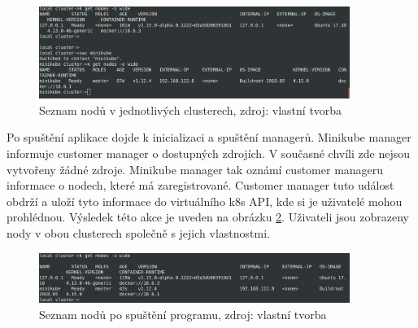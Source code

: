 \begin{figure}[H]
  \begin{centering}
    
	  \includegraphics[width=0.9\textwidth]{images/nodes-init.png}
    \par
	  \caption{Seznam nodů v jednotlivých clusterech\label{fig:nodes-init}, zdroj: vlastní tvorba}
    \end{centering}
\end{figure}

    Po spuštění aplikace dojde k inicializaci a spuštění managerů. Minikube manager informuje customer manager o dostupných zdrojích. V současné chvíli zde nejsou vytvořeny žádné zdroje. Minikube manager tak oznámí customer manageru informace o nodech, které má zaregistrované. Customer manager tuto událost obdrží a uloží tyto informace do virtuálního k8s API, kde si je uživatelé mohou prohlédnou. Výsledek této akce je uveden na obrázku \ref{fig:nodes-initialized}. Uživateli jsou zobrazeny nody v obou clusterech společně s jejich vlastnostmi.


\begin{figure}[H]
  \begin{centering}
    
	  \includegraphics[width=0.9\textwidth]{images/nodes-initialized.png}
    \par
	  \caption{Seznam nodů po spuštění programu\label{fig:nodes-initialized}, zdroj: vlastní tvorba}
    \end{centering}
\end{figure}

